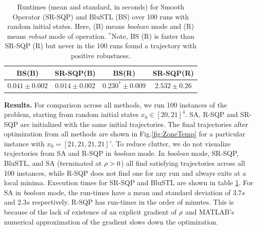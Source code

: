 \begin{table}[tb]
\small
\begin{center}
\caption{{\small Runtimes (mean and standard, in seconds) for Smooth Operator (SR-SQP) and BluSTL (BS) over 100 runs with random initial states. Here, (B) means \textit{boolean} mode and (R) means \textit{robust} mode of operation. $^*$Note, BS (R) is faster than SR-SQP (R) but never in the 100 runs found a trajectory with positive robustness.}}
\vspace{-5pt}
\label{tbl:time_performance_bldg}
\begin{tabular} {|c|c|c|c|}
	\hline
	BS(B) & SR-SQP(B) & BS(R) & SR-SQP(R) \\ \hline
	 $0.041 \pm 0.002$ &  $\mathbf{0.014 \pm 0.002}$  & $0.230^{*} \pm 0.009 $ & $2.532  \pm 0.26$ \\ \hline 
\end{tabular}	
\end{center}
\end{table}



\textbf{Results.} For comparison across all methods, we run 100 instances of the problem, starting from random initial states $x_0 \in [20,21]^4$. SA, R-SQP and SR-SQP are initialized with the same initial trajectories. The final trajectories after optimization from all methods are shown in Fig.\ref{fig:ZoneTemp} for a particular instance with $x_0 = [21,21,21,21]'$. To reduce clutter, we do not visualize trajectories from SA and R-SQP in \textit{boolean} mode. In \textit{boolean} mode, SR-SQP, BluSTL, and SA (terminated at $\rho>0$) all find satisfying trajectories across all 100 instances, while R-SQP does not find one for any run and always exits at a local minima. Execution times for SR-SQP and BluSTL are shown in table \ref{tbl:time_performance_bldg}. For SA in \textit{boolean} mode, the run-times have a mean and standard deviation of $3.7s$ and $2.3s$ respectively. R-SQP has run-times in the order of minutes. This is because of the lack of existence of an explicit gradient of $\rho$ and MATLAB's numerical approximation of the gradient slows down the optimization.



